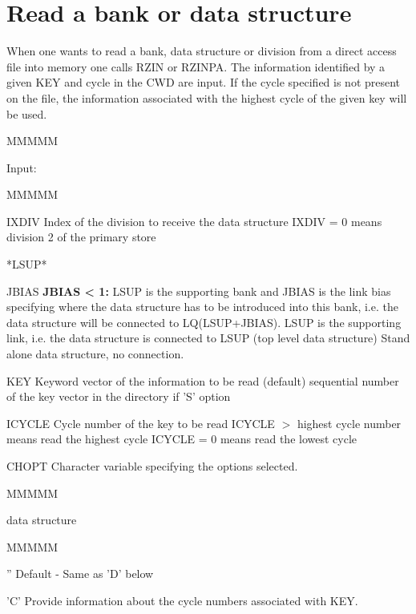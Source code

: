 \section{Read a bank or data structure}
\par When one wants to read a bank, data structure or division from
a direct access file into memory one calls RZIN or RZINPA.
The information identified by a given KEY and cycle in the CWD are
input. If the cycle specified is not present on the file, the information
associated with the highest cycle of the given key will be used.
\begin{DL}{MMMMM}
\item[Input:
]
\begin{DL}{MMMMM}
\item[IXDIV
]Index of the division to receive the data structure
\newline IXDIV = 0 means division 2 of the primary store
\item[*LSUP*
]
\item[JBIAS
]{\bf JBIAS < 1:} LSUP is the supporting bank
and JBIAS is the link bias specifying where the data structure has to be
introduced into this bank, i.e. the data structure will be connected
to LQ(LSUP+JBIAS).
LSUP is the supporting link, i.e. the data structure
is connected to LSUP (top level data structure)
 Stand alone data structure, no connection.
\item[KEY
]Keyword vector of the information to be read (default)
\newline sequential number of the key vector in the directory if 'S' option
\item[ICYCLE
]Cycle number of the key to be read
\newline ICYCLE $>$ highest cycle number means read the highest cycle
\newline ICYCLE = 0 means read the lowest cycle
\item[CHOPT
]Character variable specifying the options selected.
\begin{DL}{MMMMM}
\item[data structure
]
\begin{DL}{MMMMM}
\item[''
]Default - Same as 'D' below
\item['C'
]Provide information about the cycle numbers associated with KEY.

\end{DL}
\end{DL}
\end{DL}
\end{DL}
